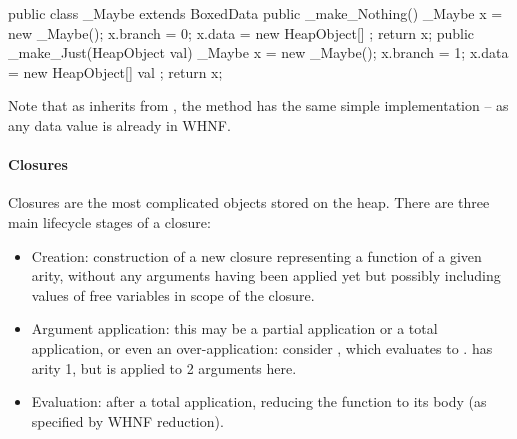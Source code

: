 \documentclass[dissertation.tex]{subfiles}
\begin{document}
{{{{                \begin{javafigure}
                public class _Maybe extends BoxedData {
                    public _make_Nothing() {
                        _Maybe x = new _Maybe();
                        x.branch = 0;
                        x.data = new HeapObject[] {};
                        return x;
                    }
                    public _make_Just(HeapObject val) {
                        _Maybe x = new _Maybe();
                        x.branch = 1;
                        x.data = new HeapObject[] { val };
                        return x;
                    }
                }
                \end{javafigure}

                Note that as  inherits from , the  method has the same simple
                implementation -- as any data value is already in WHNF.

            }
            \paragraph*{Closures}\label{sec:closures}
            {

                Closures are the most complicated objects stored on the heap. There are three main lifecycle stages of a
                closure:

                \begin{itemize}
                \item
                {
                    Creation: construction of a new closure representing a function of a given arity, without any
                    arguments having been applied yet but possibly including values of free variables in scope of the
                    closure.
                }
                \item
                {
                    
                    Argument application: this may be a partial application or a total application, or even an
                    over-application: consider , which evaluates to .  has
                    arity 1, but is applied to 2 arguments here.

                }
                \item
                {
                    Evaluation: after a total application, reducing the function to its body (as specified by WHNF
                    reduction).
                }
                \end{itemize}

}}}}
\end{document}
